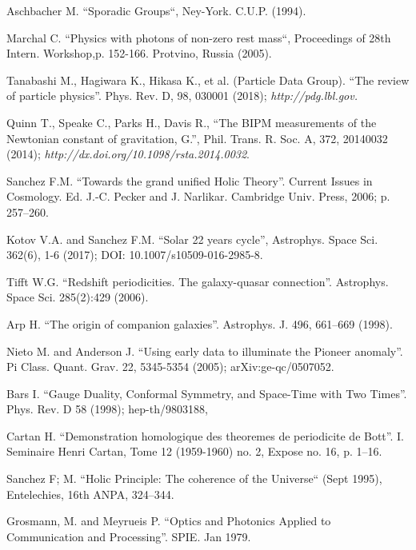 \documentclass[twoside,draft]{article}
\begin{document}
\begin{sloppypar}
\begin{thebibliography}{99}
 Aschbacher M. ``Sporadic Groups``, Ney-York. C.U.P. (1994).

 Marchal C. ``Physics with photons of non-zero rest mass``, Proceedings of 28th Intern. Workshop,p. 152-166. Protvino, Russia (2005).


 Tanabashi M., Hagiwara K., Hikasa K., et al. (Particle Data
Group). ``The review of particle physics''. Phys. Rev. D, 98, 030001 (2018);
{\it http://pdg.lbl.gov.}

 Quinn T., Speake C., Parks H., Davis R., ``The BIPM measurements
of the Newtonian constant of gravitation, G.'', Phil. Trans. R. Soc. A, 372,
20140032 (2014); {\it http://dx.doi.org/10.1098/rsta.2014.0032}.

 Sanchez F.M. ``Towards the grand unified Holic Theory''. Current
Issues in Cosmology. Ed. J.-C. Pecker and J. Narlikar. Cambridge Univ. Press,
2006; p. 257--260.

 Kotov V.A. and Sanchez F.M. ``Solar 22 years cycle'', Astrophys.
Space Sci. 362(6), 1-6 (2017); DOI: 10.1007/s10509-016-2985-8.

 Tifft W.G. ``Redshift periodicities. The galaxy-quasar
connection''. Astrophys. Space Sci. 285(2):429 (2006).

 Arp H. ``The origin of companion galaxies''. Astrophys. J. 496,
661--669 (1998).

 Nieto M. and Anderson J. ``Using early data to illuminate the
Pioneer anomaly''. Pi Class. Quant. Grav. 22, 5345-5354 (2005);
arXiv:ge-qc/0507052.

 Bars I. ``Gauge Duality, Conformal Symmetry, and Space-Time with
Two Times''. Phys. Rev. D 58 (1998); hep-th/9803188, 

 Cartan H. ``Demonstration homologique des theoremes de periodicite
de Bott''. I. Seminaire Henri Cartan, Tome 12 (1959-1960) no. 2, Expose no. 16,
p. 1--16.

 Sanchez F; M. ``Holic Principle: The coherence of the Universe`` (Sept 1995), Entelechies, 16th ANPA, 324--344.

 Grosmann, M. and Meyrueis P. ``Optics and Photonics Applied to Communication and Processing''. SPIE.  Jan 1979.


\end{thebibliography}
\end{sloppypar}
\end{document}
